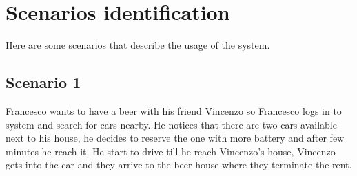 \section{Scenarios identification}
Here are some scenarios that describe the usage of the system.
\subsection{Scenario 1}
\label{scenario:1}
Francesco wants to have a beer with his friend Vincenzo so Francesco logs in to system and search for cars nearby. He notices that there are two cars available next to his house, he decides to reserve the one with more battery and after few minutes he reach it. He start to drive till he reach Vincenzo's house, Vincenzo gets into the car and they arrive to the beer house where they terminate the rent.